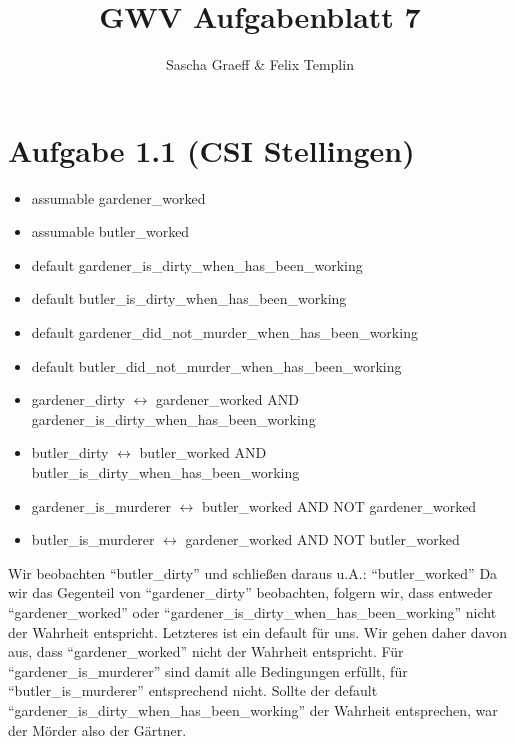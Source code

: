 \documentclass[a4paper,10pt]{article}
\title{GWV Aufgabenblatt 7}
\author{Sascha Graeff \& Felix Templin}
\begin{document}
\maketitle

\section*{Aufgabe 1.1 (CSI Stellingen)}
\begin{itemize}
  \item assumable gardener\_worked
  \item assumable butler\_worked
  \item default gardener\_is\_dirty\_when\_has\_been\_working
  \item default butler\_is\_dirty\_when\_has\_been\_working
  \item default gardener\_did\_not\_murder\_when\_has\_been\_working
  \item default butler\_did\_not\_murder\_when\_has\_been\_working
  \item gardener\_dirty $\leftrightarrow$ gardener\_worked AND gardener\_is\_dirty\_when\_has\_been\_working
  \item butler\_dirty $\leftrightarrow$ butler\_worked AND butler\_is\_dirty\_when\_has\_been\_working
  \item gardener\_is\_murderer $\leftrightarrow$ butler\_worked AND NOT gardener\_worked
  \item butler\_is\_murderer $\leftrightarrow$ gardener\_worked AND NOT butler\_worked
\end{itemize}
Wir beobachten ``butler\_dirty'' und schließen daraus u.A.: ``butler\_worked''
Da wir das Gegenteil von ``gardener\_dirty'' beobachten, folgern wir, dass entweder ``gardener\_worked'' oder ``gardener\_is\_dirty\_when\_has\_been\_working'' nicht der Wahrheit entspricht. Letzteres ist ein default für uns.
Wir gehen daher davon aus, dass ``gardener\_worked'' nicht der Wahrheit entspricht.
Für ``gardener\_is\_murderer'' sind damit alle Bedingungen erfüllt, für ``butler\_is\_murderer'' entsprechend nicht.
Sollte der default ``gardener\_is\_dirty\_when\_has\_been\_working'' der Wahrheit entsprechen, war der Mörder also der Gärtner.
\end{document}

